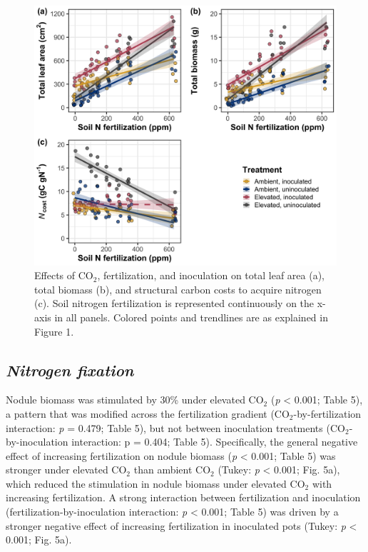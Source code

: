 \newpage
\begin{figure}
    \centering
    \includegraphics[scale = 0.074]{ch5_NxCO2xI/figs/NxCO2xI_fig4_wholePlant.png}
    \caption[Effects of CO$_2$, fertilization, and inoculation on total leaf area, total biomass, and structural carbon costs to acquire nitrogen.]{Effects of CO$_2$, fertilization, and inoculation on total leaf area (a), total biomass (b), and structural carbon costs to acquire nitrogen (c). Soil nitrogen fertilization is represented continuously on the x-axis in all panels. Colored points and trendlines are as explained in Figure 1.}
    \label{fig:figure5.4}
\end{figure}
\clearpage

\subsection{\textit{Nitrogen fixation}}
Nodule biomass was stimulated by 30\% under elevated CO$_2$ (\textit{p} < 0.001; Table 5), a pattern that was modified across the fertilization gradient (CO$_2$-by-fertilization interaction: \textit{p} = 0.479; Table 5), but not between inoculation treatments (CO$_2$-by-inoculation interaction: p = 0.404; Table 5). Specifically, the general negative effect of increasing fertilization on nodule biomass (\textit{p} < 0.001; Table 5) was stronger under elevated CO$_2$ than ambient CO$_2$ (Tukey: \textit{p} < 0.001; Fig. 5a), which reduced the stimulation in nodule biomass under elevated CO$_2$ with increasing fertilization. A strong interaction between fertilization and inoculation (fertilization-by-inoculation interaction: \textit{p} < 0.001; Table 5) was driven by a stronger negative effect of increasing fertilization in inoculated pots (Tukey: \textit{p} < 0.001; Fig. 5a).

